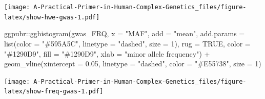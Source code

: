 \documentclass[
]{book}
\newenvironment{Shaded}{\begin{snugshade}}{\end{snugshade}}
\newcommand{\AttributeTok}[1]{\textcolor[rgb]{0.77,0.63,0.00}{#1}}
\newcommand{\ConstantTok}[1]{\textcolor[rgb]{0.00,0.00,0.00}{#1}}
\newcommand{\DecValTok}[1]{\textcolor[rgb]{0.00,0.00,0.81}{#1}}
\newcommand{\FloatTok}[1]{\textcolor[rgb]{0.00,0.00,0.81}{#1}}
\newcommand{\FunctionTok}[1]{\textcolor[rgb]{0.00,0.00,0.00}{#1}}
\newcommand{\NormalTok}[1]{#1}
\newcommand{\OtherTok}[1]{\textcolor[rgb]{0.56,0.35,0.01}{#1}}
\newcommand{\SpecialCharTok}[1]{\textcolor[rgb]{0.00,0.00,0.00}{#1}}
\newcommand{\StringTok}[1]{\textcolor[rgb]{0.31,0.60,0.02}{#1}}
\begin{document}
\texttt{[image: A-Practical-Primer-in-Human-Complex-Genetics\_files/figure-latex/show-hwe-gwas-1.pdf]}

\begin{Shaded}
\begin{Highlighting}[]
\NormalTok{ggpubr}\SpecialCharTok{::}\FunctionTok{gghistogram}\NormalTok{(gwas\_FRQ, }\AttributeTok{x =} \StringTok{"MAF"}\NormalTok{,}
                    \AttributeTok{add =} \StringTok{"mean"}\NormalTok{, }\AttributeTok{add.params =} \FunctionTok{list}\NormalTok{(}\AttributeTok{color =} \StringTok{"\#595A5C"}\NormalTok{, }\AttributeTok{linetype =} \StringTok{"dashed"}\NormalTok{, }\AttributeTok{size =} \DecValTok{1}\NormalTok{),}
                    \AttributeTok{rug =} \ConstantTok{TRUE}\NormalTok{,}
                    \AttributeTok{color =} \StringTok{"\#1290D9"}\NormalTok{, }\AttributeTok{fill =} \StringTok{"\#1290D9"}\NormalTok{,}
                    \AttributeTok{xlab =} \StringTok{"minor allele frequency"}\NormalTok{) }\SpecialCharTok{+}
  \FunctionTok{geom\_vline}\NormalTok{(}\AttributeTok{xintercept =} \FloatTok{0.05}\NormalTok{, }\AttributeTok{linetype =} \StringTok{"dashed"}\NormalTok{,}
                \AttributeTok{color =} \StringTok{"\#E55738"}\NormalTok{, }\AttributeTok{size =} \DecValTok{1}\NormalTok{)}
\end{Highlighting}
\end{Shaded}

\texttt{[image: A-Practical-Primer-in-Human-Complex-Genetics\_files/figure-latex/show-freq-gwas-1.pdf]}

\begin{Shaded}
\end{Shaded}
\end{document}
